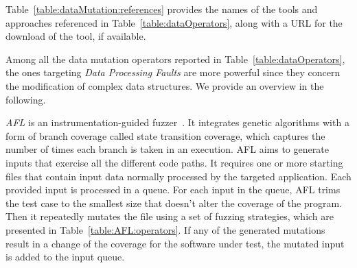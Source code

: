 Table~\ref{table:dataMutation:references} provides the names of the tools and approaches referenced in Table~\ref{table:dataOperators}, along with a URL for the download of the tool, if available.





Among all the data mutation operators reported in Table~\ref{table:dataOperators}, the ones targeting \emph{Data Processing Faults} are more powerful since they concern the modification of complex data structures. %
We provide an overview in the following.




\emph{AFL} is an instrumentation-guided fuzzer~\cite{gutmann2016fuzzing}. It integrates genetic algorithms with a form of branch coverage called state transition coverage,
which captures the number of times each branch is taken in an execution. 
AFL aims to generate inputs that exercise all the different code paths.
It requires one or more starting files that contain input data normally processed by the targeted application. 
Each provided input is processed in a queue. For each input in the queue, AFL trims the test case to the smallest size that doesn't alter the coverage of the program. Then it repeatedly mutates the file using a set of fuzzing strategies, which are presented in Table~\ref{table:AFL:operators}.
If any of the generated mutations result in a change of the coverage for the software under test, the mutated input is added to the input queue.







